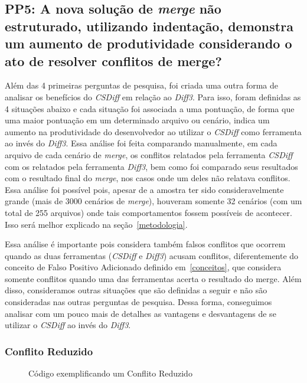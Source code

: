 \subsection{PP5: A nova solução de \emph{merge} não estruturado, utilizando
	indentação, demonstra um aumento de produtividade considerando o ato de
	resolver conflitos de merge?}\label{concept_PP5}

Além das 4 primeiras perguntas de pesquisa, foi criada uma outra forma de
analisar os benefícios do \emph{CSDiff} em relação ao \emph{Diff3}. Para isso,
foram definidas as 4 situações abaixo e cada situação foi associada a uma
pontuação, de forma que uma maior pontuação em um determinado arquivo ou
cenário, indica um aumento na produtividade do desenvolvedor ao utilizar o
\emph{CSDiff} como ferramenta ao invés do \emph{Diff3}. Essa análise foi feita
comparando manualmente, em cada arquivo de cada cenário de \emph{merge}, os
conflitos relatados pela ferramenta \emph{CSDiff} com os relatados pela
ferramenta \emph{Diff3}, bem como foi comparado seus resultados com o resultado
final do \emph{merge}, nos casos onde um deles não relatava conflitos. Essa
análise foi possível pois, apesar de a amostra ter sido consideravelmente
grande (mais de 3000 cenários de \emph{merge}), houveram somente 32 cenários
(com um total de 255 arquivos) onde tais comportamentos fossem possíveis de
acontecer. Isso será melhor explicado na seção~\ref{metodologia}.

Essa análise é importante pois considera também falsos conflitos que ocorrem
quando as duas ferramentas (\emph{CSDiff} e \emph{Diff3}) acusam conflitos,
diferentemente do conceito de Falso Positivo Adicionado definido
em~\ref{conceitos}, que considera somente conflitos quando uma das ferramentas
acerta o resultado do merge. Além disso, consideramos outras situações que são
definidas a seguir e não são consideradas nas outras perguntas de pesquisa.
Dessa forma, conseguimos analisar com um pouco mais de detalhes as vantagens e
desvantagens de se utilizar o \emph{CSDiff} ao invés do \emph{Diff3}.

\subsubsection{Conflito Reduzido}
\begin{figure}[ht]
	\begin{center}
		
		\caption{Código exemplificando um Conflito Reduzido}\label{conflito_reduzido}
	\end{center}
\end{figure}


